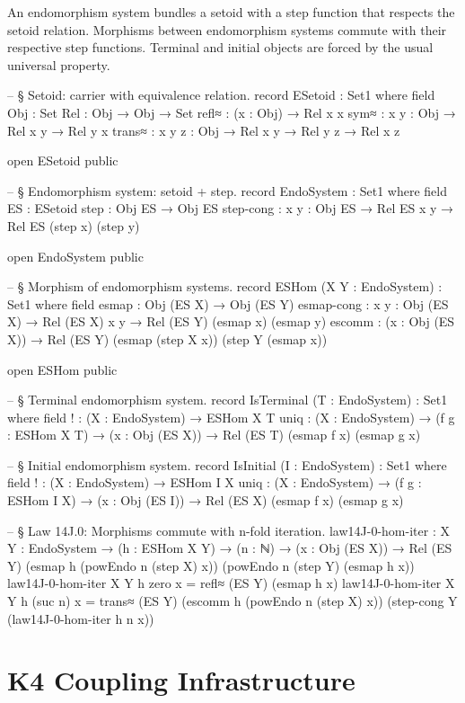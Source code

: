 \documentclass[11pt,a4paper]{book}
\def\texorpdfstring#1#2{#2}%
\begin{document}
An endomorphism system bundles a setoid with a step function that respects the setoid
relation. Morphisms between endomorphism systems commute with their respective step
functions. Terminal and initial objects are forced by the usual universal property.

\begin{code}
-- § Setoid: carrier with equivalence relation.
record ESetoid : Set1 where
  field
    Obj    : Set
    Rel    : Obj → Obj → Set
    refl≈  : (x : Obj) → Rel x x
    sym≈   : {x y : Obj} → Rel x y → Rel y x
    trans≈ : {x y z : Obj} → Rel x y → Rel y z → Rel x z

open ESetoid public

-- § Endomorphism system: setoid + step.
record EndoSystem : Set1 where
  field
    ES    : ESetoid
    step : Obj ES → Obj ES
    step-cong : {x y : Obj ES} → Rel ES x y → Rel ES (step x) (step y)

open EndoSystem public

-- § Morphism of endomorphism systems.
record ESHom (X Y : EndoSystem) : Set1 where
  field
    esmap  : Obj (ES X) → Obj (ES Y)
    esmap-cong : {x y : Obj (ES X)} → Rel (ES X) x y → Rel (ES Y) (esmap x) (esmap y)
    escomm : (x : Obj (ES X)) → Rel (ES Y) (esmap (step X x)) (step Y (esmap x))

open ESHom public

-- § Terminal endomorphism system.
record IsTerminal (T : EndoSystem) : Set1 where
  field
    !    : (X : EndoSystem) → ESHom X T
    uniq : (X : EndoSystem) → (f g : ESHom X T) → (x : Obj (ES X)) → Rel (ES T) (esmap f x) (esmap g x)

-- § Initial endomorphism system.
record IsInitial (I : EndoSystem) : Set1 where
  field
    !    : (X : EndoSystem) → ESHom I X
    uniq : (X : EndoSystem) → (f g : ESHom I X) → (x : Obj (ES I)) → Rel (ES X) (esmap f x) (esmap g x)

-- § Law 14J.0: Morphisms commute with n-fold iteration.
law14J-0-hom-iter :
  {X Y : EndoSystem} →
  (h : ESHom X Y) →
  (n : ℕ) →
  (x : Obj (ES X)) →
  Rel (ES Y) (esmap h (powEndo n (step X) x)) (powEndo n (step Y) (esmap h x))
law14J-0-hom-iter {X} {Y} h zero x = refl≈ (ES Y) (esmap h x)
law14J-0-hom-iter {X} {Y} h (suc n) x =
  trans≈ (ES Y)
    (escomm h (powEndo n (step X) x))
    (step-cong Y (law14J-0-hom-iter h n x))
\end{code}

\section{K\texorpdfstring{$_4$}{4} Coupling Infrastructure}
\end{document}
